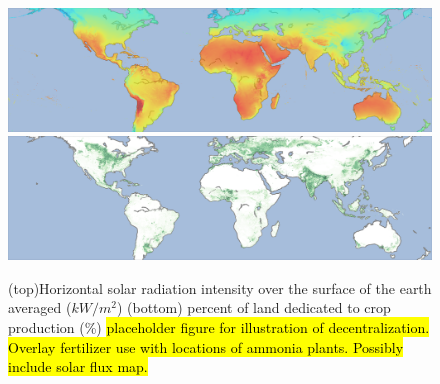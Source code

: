 \begin{figure}
    \centering
    \includegraphics[width=1\textwidth]{Figures/solar_map.png}
    \includegraphics[width=1\textwidth]{Figures/croplands_map.png}
    \caption{(top)Horizontal solar radiation intensity over the surface of the earth averaged ($kW/m^2$) (bottom) percent of land dedicated to crop production (\%) \hl{placeholder figure for illustration of decentralization. Overlay fertilizer use with locations of ammonia plants. Possibly include solar flux map.}}
    \label{fig:usemap}
\end{figure}

